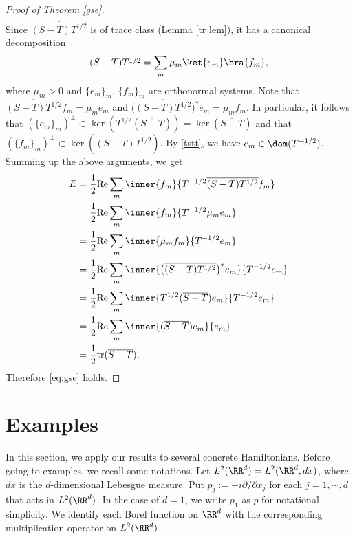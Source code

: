 \documentclass[12pt,draft]{article}
\theoremstyle{plain}
\numberwithin{equation}{section}
\theoremstyle{remark}
\begin{document}
\begin{proof}[Proof of Theorem \ref{gse}]
\begin{align}
\end{align}
Since $\overline{(S-T)T^{1/2}}$ is of trace class (Lemma \ref{tr lem}), it has a canonical decomposition
\begin{align*}
  \overline{(S-T)T^{1/2}} = \sum_m \mu_m \ket{e_m} \bra{f_m},
\end{align*}
where $\mu_m > 0$ and $\{e_m\}_m$, $\{f_m\}_m$ are orthonormal systems.
Note that $\overline{(S-T)T^{1/2}}f_m = \mu_m e_m$ and $\big(\overline{(S-T)T^{1/2}}\big)^* e_m = \mu_m f_m$.
In particular, it follows that $(\{e_m\}_m)^\perp\subset\ker(T^{1/2}(\overline{S-T}))=\ker(\overline{S-T})$ 
and that $(\{f_m\}_m)^\perp\subset\ker(\overline{(S-T)T^{1/2}})$.
By \eqref{tstt}, we have $e_m \in \dom(T^{-1/2})$.
Summing up the above arguments, we get
\begin{align*}
E &= \frac{1}{2} \mathrm{Re} \sum_m\inner{f_m}{T^{-1/2}\overline{(S-T)T^{1/2}}f_m} \\
&= \frac{1}{2} \mathrm{Re} \sum_m \inner{f_m}{T^{-1/2} \mu_m e_m} \\
&= \frac{1}{2} \mathrm{Re} \sum_m \inner{\mu_m f_m}{T^{-1/2} e_m} \\
&= \frac{1}{2} \mathrm{Re} \sum_m \inner{\big(\overline{(S-T)T^{1/2}}\big)^* e_m}{T^{-1/2} e_m} \\
&= \frac{1}{2} \mathrm{Re} \sum_m \inner{T^{1/2}(\overline{S-T}) e_m}{T^{-1/2} e_m} \\
&= \frac{1}{2} \mathrm{Re} \sum_m \inner{(\overline{S-T})e_m}{e_m} \\
&= \frac{1}{2} \mathrm{tr}(\overline{S-T}).
\end{align*}
Therefore \eqref{eq:gse} holds.
\end{proof}





\section{Examples}{\label{examples}}
In this section, we apply our results to several concrete Hamiltonians.
Before going to examples, we recall some notations.
Let $L^2(\RR^d)=L^2(\RR^d,dx)$, where $dx$ is the $d$-dimensional Lebesgue measure.
Put $p_j:=-i\partial/\partial x_j$ for each $j=1,\cdots,d$ that acts in $L^2(\RR^d)$.
In the case of $d=1$, we write $p_1$ as $p$ for notational simplicity.
We identify each Borel function on $\RR^d$ with the corresponding multiplication operator on $L^2(\RR^d)$.
\end{document}
